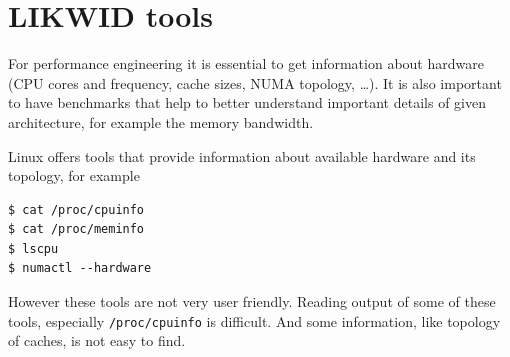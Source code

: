 %
%
%
%

\section{LIKWID tools}

For performance engineering it is essential to get information about hardware (CPU cores and frequency, cache sizes, NUMA topology, \dots). It is also important to have benchmarks that help to better understand important details of given architecture, for example the memory bandwidth.

Linux offers tools that provide information about available hardware and its topology, for example
\begin{lstlisting}
$ cat /proc/cpuinfo
$ cat /proc/meminfo
$ lscpu
$ numactl --hardware
\end{lstlisting}
However these tools are not very user friendly. Reading output of some of these tools, especially \texttt{/proc/cpuinfo} is difficult. And some information, like topology of caches, is not easy to find.

